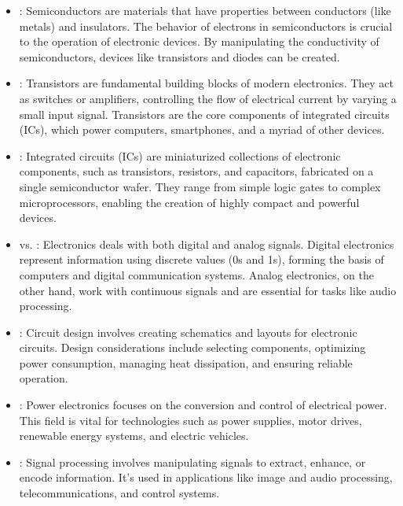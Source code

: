 \begin{itemize}
	\item {}: Semiconductors are materials that have properties between conductors (like metals) and insulators. The behavior of electrons in semiconductors is crucial to the operation of electronic devices. By manipulating the conductivity of semiconductors, devices like transistors and diodes can be created.

    \item {}: Transistors are fundamental building blocks of modern electronics. They act as switches or amplifiers, controlling the flow of electrical current by varying a small input signal. Transistors are the core components of integrated circuits (ICs), which power computers, smartphones, and a myriad of other devices.

    \item {}: Integrated circuits (ICs) are miniaturized collections of electronic components, such as transistors, resistors, and capacitors, fabricated on a single semiconductor wafer. They range from simple logic gates to complex microprocessors, enabling the creation of highly compact and powerful devices.

    \item {} vs. : Electronics deals with both digital and analog signals. Digital electronics represent information using discrete values (0s and 1s), forming the basis of computers and digital communication systems. Analog electronics, on the other hand, work with continuous signals and are essential for tasks like audio processing.

    \item {}: Circuit design involves creating schematics and layouts for electronic circuits. Design considerations include selecting components, optimizing power consumption, managing heat dissipation, and ensuring reliable operation.

    \item {}: Power electronics focuses on the conversion and control of electrical power. This field is vital for technologies such as power supplies, motor drives, renewable energy systems, and electric vehicles.

    \item {}: Signal processing involves manipulating signals to extract, enhance, or encode information. It's used in applications like image and audio processing, telecommunications, and control systems.


\end{itemize}
